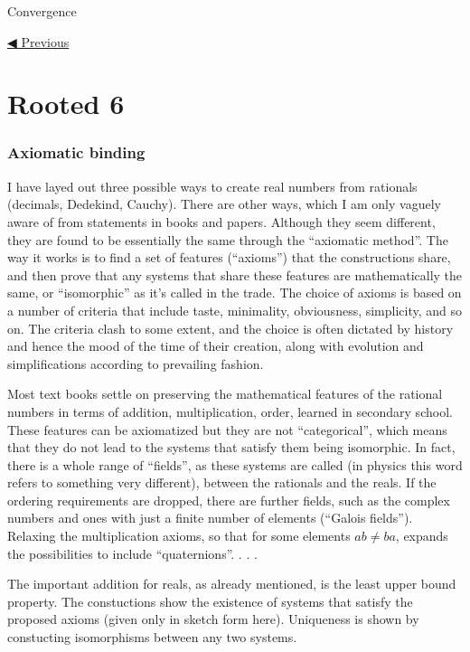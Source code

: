 C{o{n{v{e{r{g{e{n{c{e}}}}}}}}}}

\href{5.html}{◀ Previous}

\hypertarget{rooted-6}{%
\section{Rooted 6}\label{rooted-6}}

\hypertarget{axiomatic-binding}{%
\subsubsection{Axiomatic binding}\label{axiomatic-binding}}

I have layed out three possible ways to create real numbers from
rationals (decimals, Dedekind, Cauchy). There are other ways, which I am
only vaguely aware of from statements in books and papers. Although they
seem different, they are found to be essentially the same through the
``axiomatic method''. The way it works is to find a set of features
(``axioms'') that the constructions share, and then prove that any
systems that share these features are mathematically the same, or
``isomorphic'' as it's called in the trade. The choice of axioms is
based on a number of criteria that include taste, minimality,
obviousness, simplicity, and so on. The criteria clash to some extent,
and the choice is often dictated by history and hence the mood of the
time of their creation, along with evolution and simplifications
according to prevailing fashion.

Most text books settle on preserving the mathematical features of the
rational numbers in terms of addition, multiplication, order, learned in
secondary school. These features can be axiomatized but they are not
``categorical'', which means that they do not lead to the systems that
satisfy them being isomorphic. In fact, there is a whole range of
``fields'', as these systems are called (in physics this word refers to
something very different), between the rationals and the reals. If the
ordering requirements are dropped, there are further fields, such as the
complex numbers and ones with just a finite number of elements (``Galois
fields''). Relaxing the multiplication axioms, so that for some elements
\(ab \neq ba\), expands the possibilities to include ``quaternions''. .
. .

The important addition for reals, as already mentioned, is the least
upper bound property. The constuctions show the existence of systems
that satisfy the proposed axioms (given only in sketch form here).
Uniqueness is shown by constucting isomorphisms between any two systems.

